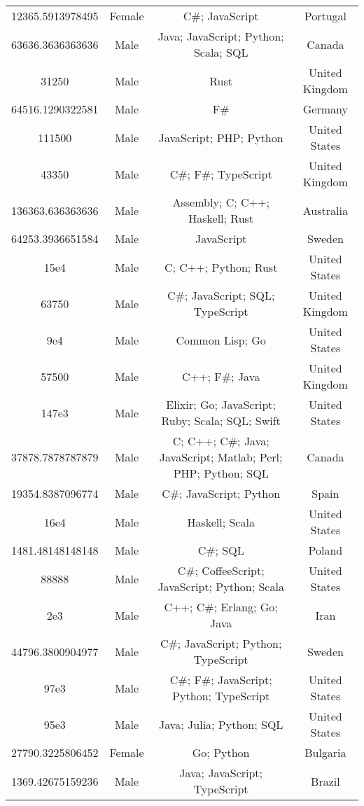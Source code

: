 \begin{center}
\begin{tabular}{ |c|c|c|c| }
12365.5913978495  &  Female  &  C\#; JavaScript  &  Portugal  \\ 
63636.3636363636  &  Male  &  Java; JavaScript; Python; Scala; SQL  &  Canada  \\ 
31250  &  Male  &  Rust  &  United Kingdom  \\ 
64516.1290322581  &  Male  &  F\#  &  Germany  \\ 
111500  &  Male  &  JavaScript; PHP; Python  &  United States  \\ 
43350  &  Male  &  C\#; F\#; TypeScript  &  United Kingdom  \\ 
136363.636363636  &  Male  &  Assembly; C; C++; Haskell; Rust  &  Australia  \\ 
64253.3936651584  &  Male  &  JavaScript  &  Sweden  \\ 
15e4  &  Male  &  C; C++; Python; Rust  &  United States  \\ 
63750  &  Male  &  C\#; JavaScript; SQL; TypeScript  &  United Kingdom  \\ 
9e4  &  Male  &  Common Lisp; Go  &  United States  \\ 
57500  &  Male  &  C++; F\#; Java  &  United Kingdom  \\ 
147e3  &  Male  &  Elixir; Go; JavaScript; Ruby; Scala; SQL; Swift  &  United States  \\ 
37878.7878787879  &  Male  &  C; C++; C\#; Java; JavaScript; Matlab; Perl; PHP; Python; SQL  &  Canada  \\ 
19354.8387096774  &  Male  &  C\#; JavaScript; Python  &  Spain  \\ 
16e4  &  Male  &  Haskell; Scala  &  United States  \\ 
1481.48148148148  &  Male  &  C\#; SQL  &  Poland  \\ 
88888  &  Male  &  C\#; CoffeeScript; JavaScript; Python; Scala  &  United States  \\ 
2e3  &  Male  &  C++; C\#; Erlang; Go; Java  &  Iran  \\ 
44796.3800904977  &  Male  &  C\#; JavaScript; Python; TypeScript  &  Sweden  \\ 
97e3  &  Male  &  C\#; F\#; JavaScript; Python; TypeScript  &  United States  \\ 
95e3  &  Male  &  Java; Julia; Python; SQL  &  United States  \\ 
27790.3225806452  &  Female  &  Go; Python  &  Bulgaria  \\ 
1369.42675159236  &  Male  &  Java; JavaScript; TypeScript  &  Brazil  \\ 

\end{tabular}
\end{center}

